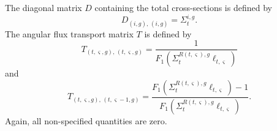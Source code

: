 The diagonal matrix $D$ containing the total cross-sections is defined by
\begin{equation}
D_{\left(i, g\right), \, \left(i, g\right)} = \Sigma_t^{i,g}.
\label{eqn:total-xs-matrix}
\end{equation}
The angular flux transport matrix $T$ is defined by
\begin{equation}
T_{\left(t,\varsigma,g\right), \, \left(t, \varsigma, g\right)} = \frac{1}{F_1\left(\Sigma_{t}^{R(t,\varsigma),g} \ell_{t,\varsigma}\right)}
\label{eqn:angular-flux-transport-matrix-1}
\end{equation}
and
\begin{equation}
T_{\left(t,\varsigma,g\right), \, \left(t, \varsigma-1, g\right)} = \frac{F_1\left(\Sigma_{t}^{R(t,\varsigma),g} \ell_{t,\varsigma}\right) - 1}{F_1\left(\Sigma_{t}^{R(t,\varsigma),g} \ell_{t,\varsigma}\right)}.
\label{eqn:angular-flux-transport-matrix-2}
\end{equation}
Again, all non-specified quantities are zero.

